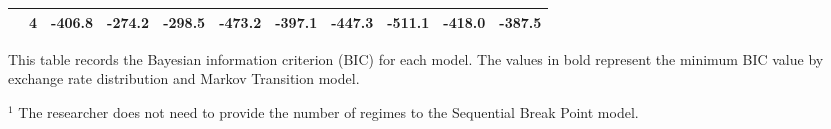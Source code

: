 \documentclass[12pt]{article}
\begin{document}
\begin{landscape}
\begin{table}
\begin{tabular}[c]{l c r r r | r r r | r r r}
				    & 4 &           -406.8 &  -274.2 &  -298.5 &           -473.2 &  -397.1 &  -447.3 &   \textbf{-511.1} &  -418.0 &   -387.5  \\
		\hline
	\end{tabular}
	\begin{tablenotes}
		\item{This table records the Bayesian information criterion (BIC) for each model. The values in bold represent the minimum BIC value by exchange rate distribution and Markov Transition model.}
		\item{\footnotesize $^{1}$ The researcher does not need to provide the number of regimes to the Sequential Break Point model.}
	\end{tablenotes}
	\label{tbl:BIC_model_comparison}
\end{table}



\end{landscape}
\end{document}
